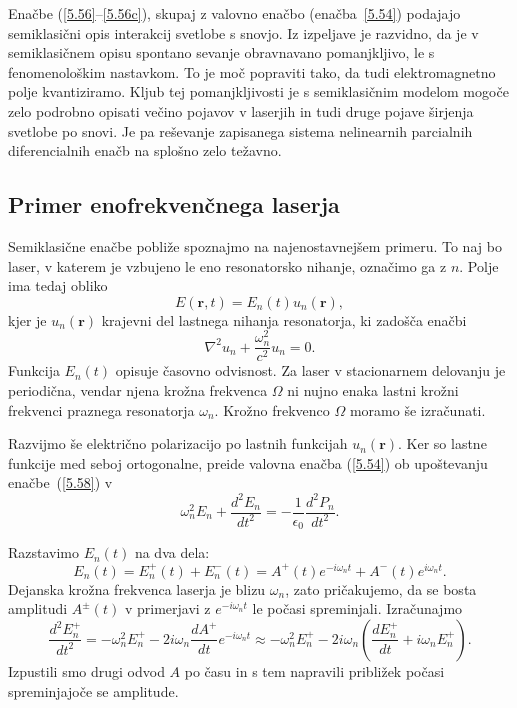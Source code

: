 Enačbe (\ref{5.56}--\ref{5.56c}), skupaj z valovno enačbo (enačba~\ref{5.54}) podajajo
semiklasični opis interakcij svetlobe s snovjo. Iz izpeljave je razvidno, da
je v semiklasičnem opisu spontano sevanje obravnavano pomanjkljivo, le s fenomenološkim
nastavkom. To je moč popraviti tako, da tudi elektromagnetno polje kvantiziramo. 
Kljub tej pomanjkljivosti je s semiklasičnim modelom mogoče zelo podrobno opisati 
večino pojavov v laserjih in tudi druge pojave širjenja svetlobe po snovi. Je pa 
reševanje zapisanega sistema nelinearnih parcialnih diferencialnih enačb  
na splošno zelo težavno.

\subsection*{Primer enofrekvenčnega laserja}
Semiklasične enačbe pobliže spoznajmo na najenostavnejšem primeru. To naj bo laser, 
v katerem je vzbujeno le eno resonatorsko nihanje, označimo ga z $n$.
Polje ima tedaj obliko
\begin{equation}  
\label{5.57}
E(\mathbf{r},t)= E_n(t)u_n(\mathbf{r}),
\end{equation}
kjer je $u_n(\mathbf{r})$ krajevni del lastnega nihanja resonatorja, ki
zadošča enačbi 
\begin{equation}  
\label{5.58}
\nabla^2 u_n+\frac{\omega_n^2}{c^2}u_n=0.
\end{equation}
Funkcija $E_n(t)$ opisuje časovno odvisnost. Za laser v stacionarnem
delovanju je periodična, vendar njena krožna frekvenca $\Omega$ ni nujno enaka lastni
krožni frekvenci praznega resonatorja $\omega_n$. Krožno frekvenco 
$\Omega$ moramo še izračunati.

Razvijmo še električno polarizacijo po lastnih funkcijah $u_n(\mathbf{r})$. 
Ker so lastne funkcije med seboj ortogonalne, preide valovna enačba (\ref{5.54}) 
ob upoštevanju enačbe~(\ref{5.58}) v 
\begin{equation}  
\label{5.59}
\omega_n^2 E_n+\frac{d^2 E_n}{dt^2}= 
-\frac{1}{\epsilon_0}\frac{d^2P_n}{dt^2}.
\end{equation}

Razstavimo $E_n(t)$ na dva dela: 
\begin{equation}  \label{5.60}
E_n(t)=E_n^+(t)+E_n^-(t)=A^+(t)e^{-i
\omega_nt}+A^-(t)e^{i \omega_nt}.
\end{equation}
Dejanska krožna frekvenca laserja je blizu $\omega_n$, zato pričakujemo,
da se bosta amplitudi $A^{\pm}(t)$ v primerjavi z $e^{-i \omega_nt}$ le
počasi spreminjali. Izračunajmo 
\begin{equation}  
\label{5.61}
\frac{d^2 E_n^+}{dt^2}=-\omega_n^2 E_n^+ - 2i \omega_n 
\frac{dA^+}{dt} e^{-i \omega_nt} \approx 
-\omega_n^2 E_n^+-2i \omega_n\left(\frac{dE_n^+}{dt}+
i \omega_nE_n^+\right).
\end{equation}
Izpustili smo drugi odvod $A$ po času in s tem napravili približek počasi spreminjajoče se amplitude.

